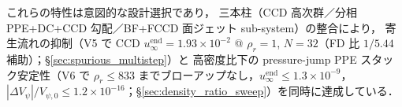 これらの特性は意図的な設計選択であり，
三本柱（CCD 高次群／分相 PPE+DC+CCD 勾配／BF+FCCD 面ジェット sub-system）の整合により，
寄生流れの抑制（V5 で CCD $u_\infty^{\mathrm{end}}=1.93\!\times\!10^{-2}$ @ $\rho_r=1$, $N=32$（FD 比 $1/5.44$ 補助）；§\ref{sec:spurious_multistep}）と
	高密度比下の pressure-jump PPE スタック安定性（V6 で $\rho_r \le 833$ までブローアップなし，$u_\infty^{\mathrm{end}}\le1.3\!\times\!10^{-9}$，$|\Delta V_\psi|/V_{\psi,0} \le 1.2\!\times\!10^{-16}$；§\ref{sec:density_ratio_sweep}）を同時に達成している．

